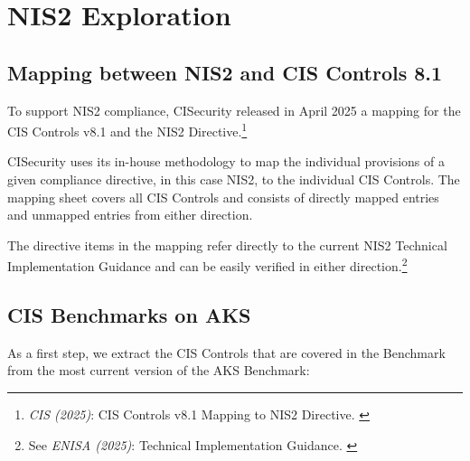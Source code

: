 %
%

\pagebreak
\section{NIS2 Exploration}

\onehalfspacing

\subsection{Mapping between NIS2 and CIS Controls 8.1}

To support NIS2 compliance, CISecurity released in April 2025 a mapping for the CIS Controls v8.1 and the NIS2 Directive.\footnote{\textit{CIS (2025)}: CIS Controls v8.1 Mapping to NIS2 Directive. \cite{cisMapNis2}}

CISecurity uses its in-house methodology to map the individual provisions of a given compliance directive, in this case NIS2, to the individual CIS Controls. The mapping sheet covers all CIS Controls and consists of directly mapped entries and unmapped entries from either direction.

The directive items in the mapping refer directly to the current NIS2 Technical Implementation Guidance and can be easily verified in either direction.\footnote{See \textit{ENISA (2025)}: Technical Implementation Guidance. \cite{nis2}}

\subsection{CIS Benchmarks on AKS}

As a first step, we extract the CIS Controls that are covered in the Benchmark from the most current version of the AKS Benchmark:

